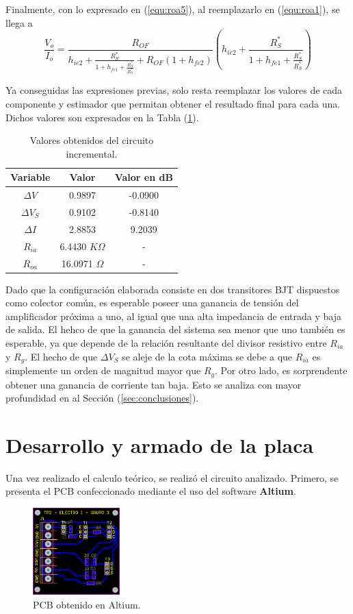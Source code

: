 Finalmente, con lo expresado en (\ref{equ:roa5}), al reemplazarlo en (\ref{equ:roa1}), se llega a
\begin{equation}
	\frac{V_o}{I_o} = \frac{R_{OF}}{h_{ie2} + \frac{R_{S}^{*}} {1 + h_{fe1} + \frac{R_{S}^{*}}{R_{S}^{*}}}  + R_{OF} \left( 1 + h_{fe2} \right)} \left( h_{ie2} + \frac{R_{S}^{*}} {1 + h_{fe1} + \frac{R_{S}^{*}}{R_{S}^{*}}}  \right)
	\label{equ:roa}
\end{equation}

Ya conseguidas las expresiones previas, solo resta reemplazar los valores de cada componente y estimador que permitan obtener el resultado final para cada una. Dichos valores son expresados en la Tabla (\ref{tab:resultados}).

\begin{table}[H]
\centering
\begin{tabular}{ccc}
\hline
\textbf{Variable} & \textbf{Valor} & \textbf{Valor en dB} \\
\hline
$\Delta V$ & 0.9897 & -0.0900 \\
$\Delta V_S$ & 0.9102 & -0.8140 \\
$\Delta I$ & 2.8853 & 9.2039 \\
$R_{ia}$ & 6.4430 $K\Omega$ & - \\
$R_{oa}$ & 16.0971 $\Omega$ & - \\
\hline
\end{tabular}
\caption{Valores obtenidos del circuito incremental.}
\label{tab:resultados}
\end{table}

Dado que la configuración elaborada consiste en dos transitores BJT dispuestos como colector común, es esperable poseer una ganancia de tensión del amplificador próxima a uno, al igual que una alta impedancia de entrada y baja de salida. El hehco de que la ganancia del sistema sea menor que uno también es esperable, ya que depende de la relación resultante del divisor resistivo entre $R_{ia}$ y $R_g$. El hecho de que $\Delta V_S$ se aleje de la cota máxima se debe a que $R_{ia}$ es simplemente un orden de magnitud mayor que $R_g$. Por otro lado, es sorprendente obtener una ganancia de corriente tan baja. Esto se analiza con mayor profundidad en al Sección (\ref{sec:conclusiones}).

\section{Desarrollo y armado de la placa}
Una vez realizado el calculo teórico, se realizó el circuito analizado. Primero, se presenta el PCB confeccionado mediante el uso del software \textbf{Altium}.
\begin{figure}[H]
\centering
	\includegraphics[width=0.3\textwidth]{Imagenes/PCB.png}
	\caption{PCB obtenido en Altium.}
\end{figure}

